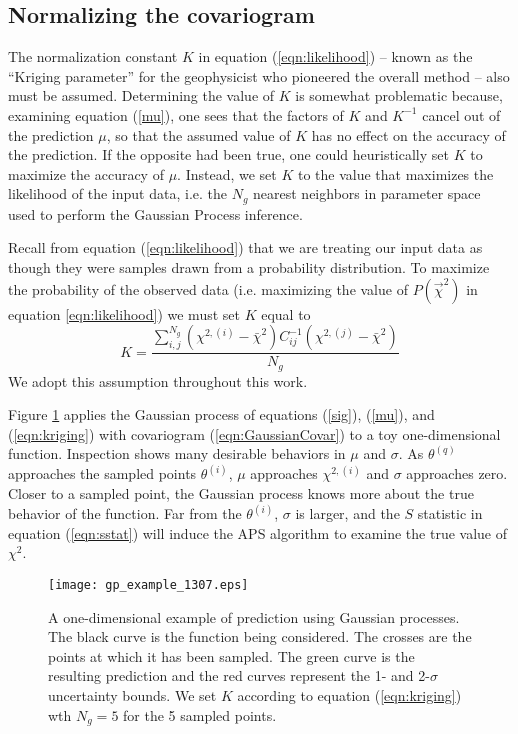 \documentclass[useAMS,usenatbib]{aastex}
\newcommand{\APS}{APS }
\begin{document}
\subsection{Normalizing the covariogram}
\label{sec:kriging}

The normalization constant $K$ in equation (\ref{eqn:likelihood}) -- known as the
``Kriging parameter'' for the geophysicist who pioneered the overall method -- 
also
must be assumed.  Determining the value of $K$ 
is somewhat problematic because, examining equation
(\ref{mu}), one sees that the factors of $K$ and $K^{-1}$
cancel out of
the prediction $\mu$, so that the assumed value of $K$ has no effect on the accuracy
of the prediction.  
If the opposite had been true, one could heuristically set $K$ to
maximize the accuracy of $\mu$.  
Instead, we set $K$ to the value that maximizes the likelihood
of the input data, i.e. the $N_g$ nearest neighbors in parameter space
used to perform the Gaussian Process inference.

Recall from equation (\ref{eqn:likelihood}) that we are treating our
input data as though they were samples drawn from a probability distribution.
To maximize the probability of the observed data (i.e. maximizing the value
of $P(\vec{\chi}^2)$ in equation \ref{eqn:likelihood}) we must set $K$ equal to
\begin{equation}
\label{eqn:kriging}
K=\frac{\sum_{i,j}^{N_g}(\chi^{2,(i)}-\bar{\chi}^2)
C^{-1}_{ij}(\chi^{2,(j)}-\bar{\chi}^2)}
{N_g}
\end{equation}
We adopt this assumption throughout this work.

Figure \ref{fig:gp} applies the Gaussian process of equations (\ref{sig}), 
(\ref{mu}), and (\ref{eqn:kriging}) with covariogram (\ref{eqn:GaussianCovar})
to a toy one-dimensional function.  Inspection shows many desirable
behaviors in $\mu$ and $\sigma$.  
As $\theta^{(q)}$ approaches the sampled points $\theta^{(i)}$, $\mu$
approaches $\chi^{2,(i)}$ and $\sigma$ approaches zero.  
Closer to a sampled point,
the Gaussian process knows more about the true behavior of the function. 
Far from the $\theta^{(i)}$, $\sigma$ is larger, and the $S$ statistic in
equation (\ref{eqn:sstat}) will induce the \APS
algorithm to examine the true value of $\chi^2$.

\begin{figure}
\texttt{[image: gp\_example\_1307.eps]}
\caption{
A one-dimensional example of prediction using Gaussian processes.  
The black curve is the function
being considered.  The crosses are the points at which it has been sampled.  The
green curve is the resulting prediction and the red curves represent the 
1- and
2-$\sigma$ uncertainty bounds.  We set $K$ according to 
equation (\ref{eqn:kriging}) wth $N_g=5$ for the 5 sampled points.
}
\label{fig:gp}
\end{figure}
\end{document}

